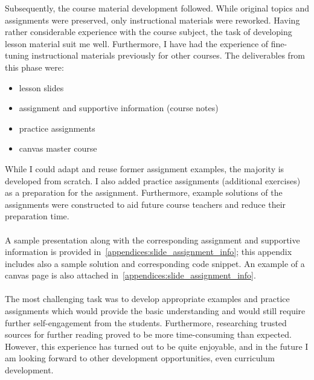 Subsequently, the course material development followed. 
While original topics and assignments were preserved, only instructional materials were reworked.
Having rather considerable experience with the course subject, the task of developing lesson material suit me well. 
Furthermore, I have had the experience of fine-tuning instructional materials previously for other courses. The deliverables from this phase were:  
\begin{itemize}
    \item lesson slides
    \item assignment and supportive information (course notes)
    \item practice assignments
    \item \Gls{canvas} master course
\end{itemize}
While I could adapt and reuse former assignment examples, the majority is developed from scratch. 
I also added practice assignments (additional exercises) as a preparation for the assignment. 
Furthermore, example solutions of the assignments were constructed to aid future course teachers and reduce their preparation time.\\\\
A sample presentation along with the corresponding assignment and supportive information is provided in~\cref{appendices:slide_assignment_info}; this appendix includes also a sample solution and corresponding code snippet. 
An example of a \Gls{canvas} page is also attached in~\cref{appendices:slide_assignment_info}.\\\\
The most challenging task was to develop appropriate examples and practice assignments which would provide the basic understanding and would still require further self-engagement from the students.
Furthermore, researching trusted sources for further reading proved to be more time-consuming than expected. 
However, this experience has turned out to be quite enjoyable, and in the future I am looking forward to other development opportunities, even curriculum development.